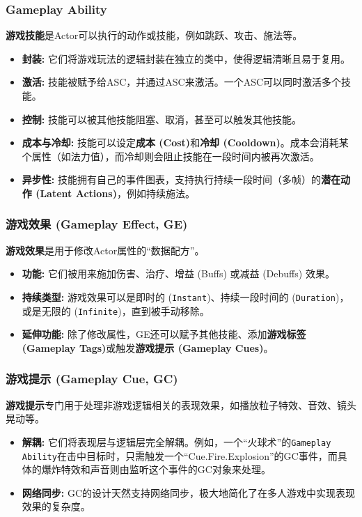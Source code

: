 \documentclass[math,code,10pt,CJKmath]{amznotes}
\newcommand{\il}[1]{\texttt{#1}}%
\begin{document}
\subsubsection{Gameplay Ability}
\textbf{游戏技能}是Actor可以执行的动作或技能，例如跳跃、攻击、施法等。
\begin{itemize}
    \item \textbf{封装:} 它们将游戏玩法的逻辑封装在独立的类中，使得逻辑清晰且易于复用。
    \item \textbf{激活:} 技能被赋予给ASC，并通过ASC来激活。一个ASC可以同时激活多个技能。
    \item \textbf{控制:} 技能可以被其他技能阻塞、取消，甚至可以触发其他技能。
    \item \textbf{成本与冷却:} 技能可以设定\textbf{成本 (Cost)}和\textbf{冷却 (Cooldown)}。成本会消耗某个属性（如法力值），而冷却则会阻止技能在一段时间内被再次激活。
    \item \textbf{异步性:} 技能拥有自己的事件图表，支持执行持续一段时间（多帧）的\textbf{潜在动作 (Latent Actions)}，例如持续施法。
\end{itemize}

\subsubsection{游戏效果 (Gameplay Effect, GE)}
\textbf{游戏效果}是用于修改Actor属性的“数据配方”。
\begin{itemize}
    \item \textbf{功能:} 它们被用来施加伤害、治疗、增益 (Buffs) 或减益 (Debuffs) 效果。
    \item \textbf{持续类型:} 游戏效果可以是即时的 (\il{Instant})、持续一段时间的 (\il{Duration})，或是无限的 (\il{Infinite})，直到被手动移除。
    \item \textbf{延伸功能:} 除了修改属性，GE还可以赋予其他技能、添加\textbf{游戏标签 (Gameplay Tags)}或触发\textbf{游戏提示 (Gameplay Cues)}。
\end{itemize}

\subsubsection{游戏提示 (Gameplay Cue, GC)}
\textbf{游戏提示}专门用于处理非游戏逻辑相关的表现效果，如播放粒子特效、音效、镜头晃动等。
\begin{itemize}
    \item \textbf{解耦:} 它们将表现层与逻辑层完全解耦。例如，一个“火球术”的\texttt{Gameplay Ability}在击中目标时，只需触发一个“Cue.Fire.Explosion”的GC事件，而具体的爆炸特效和声音则由监听这个事件的GC对象来处理。
    \item \textbf{网络同步:} GC的设计天然支持网络同步，极大地简化了在多人游戏中实现表现效果的复杂度。
\end{itemize}
\end{document}
